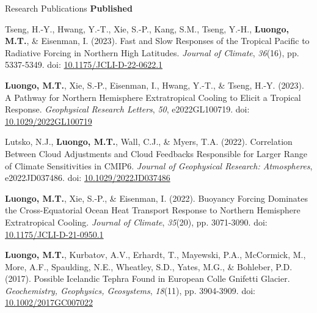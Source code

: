 \documentclass{resume} %
\begin{document}
\begin{rSection}{Research Publications}
\textbf{Published}
\begin{etaremune}
\item Tseng, H.-Y., Hwang, Y.-T., Xie, S.-P., Kang, S.M., Tseng, Y.-H., \textbf{Luongo, M.T.}, \& Eisenman, I. (2023). Fast and Slow Responses of the Tropical Pacific to Radiative Forcing in Northern High Latitudes. \textit{Journal of Climate}, \textit{36}(16), pp. 5337-5349. doi:
\textcolor{violet}{\href{https://journals.ametsoc.org/view/journals/clim/36/16/JCLI-D-22-0622.1.xml}{10.1175/JCLI-D-22-0622.1}}
\item \textbf{Luongo, M.T.}, Xie, S.-P., Eisenman, I., Hwang, Y.-T., \& Tseng, H.-Y. (2023). A Pathway for Northern Hemisphere Extratropical Cooling to Elicit a Tropical Response. \textit{Geophysical Research Letters}, \textit{50}, e2022GL100719. doi: \textcolor{violet}{\href{https://agupubs.onlinelibrary.wiley.com/doi/10.1029/2022GL100719}{10.1029/2022GL100719}}
\item Lutsko, N.J., \textbf{Luongo, M.T.}, Wall, C.J., \& Myers, T.A. (2022). Correlation Between Cloud Adjustments and Cloud Feedbacks Responsible for Larger Range of Climate Sensitivities in CMIP6. \textit{Journal of Geophysical Research: Atmospheres}, e2022JD037486. doi: \textcolor{violet}{\href{https://agupubs.onlinelibrary.wiley.com/doi/10.1029/2022JD037486}{10.1029/2022JD037486}}
\item \textbf{Luongo, M.T.}, Xie, S.-P., \& Eisenman, I. (2022). Buoyancy Forcing Dominates the Cross-Equatorial Ocean Heat Transport Response to Northern Hemisphere Extratropical Cooling. \textit{Journal of Climate}, \textit{35}(20), pp. 3071-3090. doi:
\textcolor{violet}{\href{https://journals.ametsoc.org/view/journals/clim/aop/JCLI-D-21-0950.1/JCLI-D-21-0950.1.xml}{10.1175/JCLI-D-21-0950.1}}
\item \textbf{Luongo, M.T.}, Kurbatov, A.V., Erhardt, T., Mayewski, P.A., McCormick, M., More, A.F., Spaulding, N.E., Wheatley, S.D., Yates, M.G., \& Bohleber, P.D. (2017). Possible Icelandic Tephra Found in European Colle Gnifetti Glacier. \textit{Geochemistry, Geophysics, Geosystems}, \textit{18}(11), pp. 3904-3909. doi: \textcolor{violet}{\href{https://agupubs.onlinelibrary.wiley.com/doi/full/10.1002/2017GC007022}{10.1002/2017GC007022}}
\end{etaremune}



\end{rSection}
\end{document}
